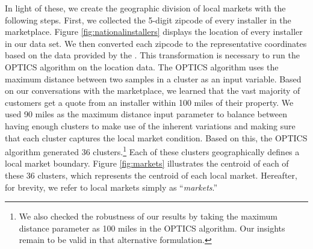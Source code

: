 \documentclass[msom,blindrev]{informs3}
\begin{document}
In light of these, we create the geographic division of local markets with the following steps. First, we collected the 5-digit zipcode of
every installer in the marketplace. Figure \ref{fig:nationalinstallers} displays the location of every installer in our data set. We then converted each zipcode  to the representative coordinates based on the data provided by the \citet{us_census_bureau_2019}. This transformation is necessary to run the OPTICS algorithm on the location data. The OPTICS algorithm uses the maximum distance between two samples in a cluster as an input variable. Based on our conversations with the marketplace, we learned that the vast majority of customers get a quote from an installer within 100 miles of their property. We used 90 miles as the maximum distance input parameter to balance between having enough clusters to make use of the inherent variations and making sure that each cluster captures the local market condition. Based on this, the OPTICS algorithm generated 36 clusters.\footnote{We also checked the robustness of our results by taking the maximum distance parameter as 100 miles in the OPTICS algorithm. Our insights remain to be valid in that alternative formulation.} Each of these clusters geographically defines a local market boundary. Figure \ref{fig:markets} illustrates the centroid of each of these 36 clusters, which represents the centroid of each local market. Hereafter, for brevity, we refer to local markets simply as ``\emph{markets}.''



\end{document}
